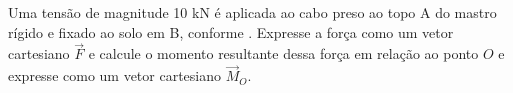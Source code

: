 Uma tensão de magnitude 10 kN é aplicada ao cabo preso ao topo A do mastro rígido e fixado ao solo em B, conforme \figuraquestao. Expresse a força como um vetor cartesiano $\vec{F}$ e calcule o momento resultante dessa força em relação ao ponto $O$ e expresse como um vetor cartesiano $\vec{M}_O$.




